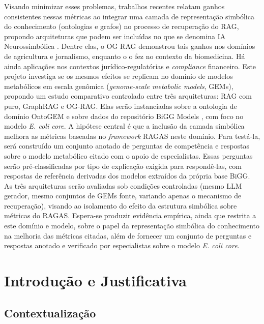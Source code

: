 \documentclass{article}
\begin{document}
	Visando minimizar esses problemas, trabalhos recentes relatam ganhos consistentes nessas métricas ao integrar uma camada de representação simbólica do conhecimento (ontologias e grafos) no processo de recuperação do RAG, propondo arquiteturas que podem ser incluídas no que se denomina IA Neurossimbólica \cite{shakarian2023neurosymbolic}.
	Dentre elas,  o OG RAG \cite{sharma2025ograg} demonstrou tais ganhos nos domínios de agricultura e jornalismo, enquanto o \cite{feng2025ontologyrag} o fez no  contexto da biomedicina. Há ainda aplicações nos contextos jurídico-regulatórias e \textit{compliance} financeiro. Este projeto investiga se os mesmos efeitos se replicam no domínio de modelos metabólicos em escala genômica (\textit{genome-scale metabolic models}, GEMs), propondo um estudo comparativo controlado entre três arquiteturas: RAG com  puro, GraphRAG e OG-RAG. Elas serão instanciadas sobre a ontologia de domínio OntoGEM \cite{souza2025ontogem} e sobre dados do repositório BiGG Models \cite{king2016bigg}, com foco no modelo \textit{E. coli core}. A hipótese central é que a inclusão da camada simbólica melhora as métricas baseadas no \textit{framework} RAGAS \cite{es-etal-2024-ragas} neste domínio. Para testá-la, será construído um conjunto anotado de perguntas de competência e respostas sobre o modelo metabólico citado com o apoio de especialistas. Essas perguntas serão pré-classificadas por tipo de explicação exigida para respondê-las, com respostas de referência derivadas dos modelos extraídos da própria base BiGG. As três arquiteturas serão avaliadas sob condições controladas (mesmo LLM gerador, mesmo conjuntos de GEMs fonte, variando apenas o mecanismo de recuperação), visando ao isolamento do efeito da estrutura simbólica sobre métricas do RAGAS. Espera-se produzir evidência empírica, ainda que restrita a este domínio e modelo, sobre o papel da representação simbólica do conhecimento na melhoria das métricas citadas, além de fornecer um conjunto de perguntas e respostas anotado e verificado por especialistas sobre o modelo \textit{E. coli core}.
	
	\newpage
	
	\section{Introdução e Justificativa}
	
	\subsection{Contextualização}
	
\end{document}
